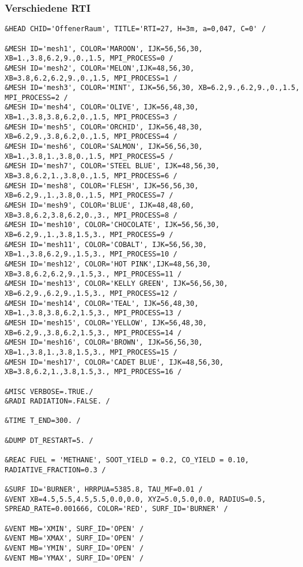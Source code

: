 \subsubsection{Verschiedene RTI}
\begin{lstlisting}[emptylines=0,basicstyle=\tiny]
&HEAD CHID='OffenerRaum', TITLE='RTI=27, H=3m, a=0,047, C=0' /

&MESH ID='mesh1', COLOR='MAROON', IJK=56,56,30, XB=1.,3.8,6.2,9.,0.,1.5, MPI_PROCESS=0 /
&MESH ID='mesh2', COLOR='MELON',IJK=48,56,30, XB=3.8,6.2,6.2,9.,0.,1.5, MPI_PROCESS=1 /
&MESH ID='mesh3', COLOR='MINT', IJK=56,56,30, XB=6.2,9.,6.2,9.,0.,1.5, MPI_PROCESS=2 /
&MESH ID='mesh4', COLOR='OLIVE', IJK=56,48,30, XB=1.,3.8,3.8,6.2,0.,1.5, MPI_PROCESS=3 /
&MESH ID='mesh5', COLOR='ORCHID', IJK=56,48,30, XB=6.2,9.,3.8,6.2,0.,1.5, MPI_PROCESS=4 /
&MESH ID='mesh6', COLOR='SALMON', IJK=56,56,30, XB=1.,3.8,1.,3.8,0.,1.5, MPI_PROCESS=5 /
&MESH ID='mesh7', COLOR='STEEL BLUE', IJK=48,56,30, XB=3.8,6.2,1.,3.8,0.,1.5, MPI_PROCESS=6 /
&MESH ID='mesh8', COLOR='FLESH', IJK=56,56,30, XB=6.2,9.,1.,3.8,0.,1.5, MPI_PROCESS=7 /
&MESH ID='mesh9', COLOR='BLUE', IJK=48,48,60, XB=3.8,6.2,3.8,6.2,0.,3., MPI_PROCESS=8 /
&MESH ID='mesh10', COLOR='CHOCOLATE', IJK=56,56,30, XB=6.2,9.,1.,3.8,1.5,3., MPI_PROCESS=9 /
&MESH ID='mesh11', COLOR='COBALT', IJK=56,56,30, XB=1.,3.8,6.2,9.,1.5,3., MPI_PROCESS=10 /
&MESH ID='mesh12', COLOR='HOT PINK',IJK=48,56,30, XB=3.8,6.2,6.2,9.,1.5,3., MPI_PROCESS=11 /
&MESH ID='mesh13', COLOR='KELLY GREEN', IJK=56,56,30, XB=6.2,9.,6.2,9.,1.5,3., MPI_PROCESS=12 /
&MESH ID='mesh14', COLOR='TEAL', IJK=56,48,30, XB=1.,3.8,3.8,6.2,1.5,3., MPI_PROCESS=13 /
&MESH ID='mesh15', COLOR='YELLOW', IJK=56,48,30, XB=6.2,9.,3.8,6.2,1.5,3., MPI_PROCESS=14 /
&MESH ID='mesh16', COLOR='BROWN', IJK=56,56,30, XB=1.,3.8,1.,3.8,1.5,3., MPI_PROCESS=15 /
&MESH ID='mesh17', COLOR='CADET BLUE', IJK=48,56,30, XB=3.8,6.2,1.,3.8,1.5,3., MPI_PROCESS=16 /

&MISC VERBOSE=.TRUE./
&RADI RADIATION=.FALSE. /

&TIME T_END=300. /

&DUMP DT_RESTART=5. /

&REAC FUEL = 'METHANE', SOOT_YIELD = 0.2, CO_YIELD = 0.10, RADIATIVE_FRACTION=0.3 /

&SURF ID='BURNER', HRRPUA=5385.8, TAU_MF=0.01 /
&VENT XB=4.5,5.5,4.5,5.5,0.0,0.0, XYZ=5.0,5.0,0.0, RADIUS=0.5, SPREAD_RATE=0.001666, COLOR='RED', SURF_ID='BURNER' /

&VENT MB='XMIN', SURF_ID='OPEN' /  
&VENT MB='XMAX', SURF_ID='OPEN' /  
&VENT MB='YMIN', SURF_ID='OPEN' /  
&VENT MB='YMAX', SURF_ID='OPEN' / 
 

\end{lstlisting}
